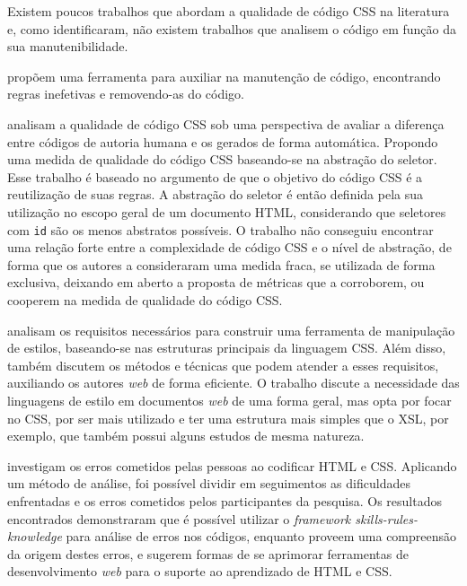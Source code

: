 Existem poucos trabalhos que abordam a qualidade de código CSS na literatura e, como  identificaram, não existem trabalhos que analisem o código em função da sua manutenibilidade.

 propõem uma ferramenta para auxiliar na manutenção de código, encontrando regras inefetivas e removendo-as do código.

 analisam a qualidade de código CSS sob uma perspectiva de avaliar a diferença entre códigos de autoria humana e os gerados de forma automática. Propondo uma medida de qualidade do código CSS baseando-se na abstração do seletor. Esse trabalho é baseado no argumento de que o objetivo do código CSS é a reutilização de suas regras. A abstração do seletor é então definida pela sua utilização no escopo geral de um documento HTML, considerando que seletores com \texttt{id} são os menos abstratos possíveis. O trabalho não conseguiu encontrar uma relação forte entre a complexidade de código CSS e o nível de abstração, de forma que os autores a consideraram uma medida fraca, se utilizada de forma exclusiva, deixando em aberto a proposta de métricas que a corroborem, ou cooperem na medida de qualidade do código CSS.

 analisam os requisitos necessários para construir uma ferramenta de manipulação de estilos, baseando-se nas estruturas principais da linguagem CSS. Além disso, também discutem os métodos e técnicas que podem atender a esses requisitos, auxiliando os autores \textit{web} de forma eficiente. O trabalho discute a necessidade das linguagens de estilo em documentos \textit{web} de uma forma geral, mas opta por focar no CSS, por ser mais utilizado e ter uma estrutura mais simples que o XSL\footnotemark, por exemplo, que também possui alguns estudos de mesma natureza.


 investigam os erros cometidos pelas pessoas ao codificar HTML e CSS. Aplicando um método de análise, foi possível dividir em seguimentos as dificuldades enfrentadas e os erros cometidos pelos participantes da pesquisa. Os resultados encontrados demonstraram que é possível utilizar o \textit{framework skills-rules-knowledge} para análise de erros nos códigos, enquanto proveem uma compreensão da origem destes erros, e sugerem formas de se aprimorar ferramentas de desenvolvimento \textit{web} para o suporte ao aprendizado de HTML e CSS.

